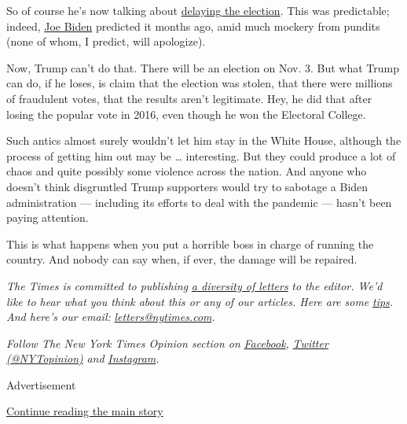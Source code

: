 So of course he's now talking about
\href{https://www.washingtonpost.com/politics/trump-floats-idea-of-delaying-the-november-election-as-he-ramps-up-attacks-on-voting-by-mail/2020/07/30/15fe7ac6-d264-11ea-9038-af089b63ac21_story.html?hpid=hp_hp-top-table-main_trumpelection-920am\%3Ahomepage\%2Fstory-ans}{delaying
the election}. This was predictable; indeed,
\href{https://www.usatoday.com/story/news/politics/2020/04/24/joe-biden-says-trump-try-kick-back-election-november/3018352001/}{Joe
Biden} predicted it months ago, amid much mockery from pundits (none of
whom, I predict, will apologize).

Now, Trump can't do that. There will be an election on Nov. 3. But what
Trump can do, if he loses, is claim that the election was stolen, that
there were millions of fraudulent votes, that the results aren't
legitimate. Hey, he did that after losing the popular vote in 2016, even
though he won the Electoral College.

Such antics almost surely wouldn't let him stay in the White House,
although the process of getting him out may be \ldots{} interesting. But
they could produce a lot of chaos and quite possibly some violence
across the nation. And anyone who doesn't think disgruntled Trump
supporters would try to sabotage a Biden administration --- including
its efforts to deal with the pandemic --- hasn't been paying attention.

This is what happens when you put a horrible boss in charge of running
the country. And nobody can say when, if ever, the damage will be
repaired.

\emph{The Times is committed to publishing}
\href{https://www.nytimes.com/2019/01/31/opinion/letters/letters-to-editor-new-york-times-women.html}{\emph{a
diversity of letters}} \emph{to the editor. We'd like to hear what you
think about this or any of our articles. Here are some}
\href{https://help.nytimes.com/hc/en-us/articles/115014925288-How-to-submit-a-letter-to-the-editor}{\emph{tips}}\emph{.
And here's our email:}
\href{mailto:letters@nytimes.com}{\emph{letters@nytimes.com}}\emph{.}

\emph{Follow The New York Times Opinion section on}
\href{https://www.facebook.com/nytopinion}{\emph{Facebook}}\emph{,}
\href{http://twitter.com/NYTOpinion}{\emph{Twitter (@NYTopinion)}}
\emph{and}
\href{https://www.instagram.com/nytopinion/}{\emph{Instagram}}\emph{.}

Advertisement

\protect\hyperlink{after-bottom}{Continue reading the main story}

